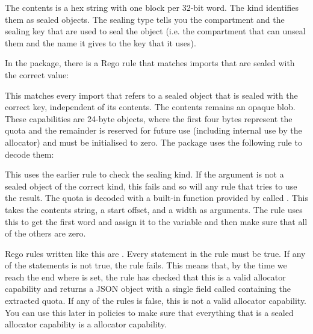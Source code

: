 {\begin{jsonsnippet}
{
  "contents": "00040000 00000000 00000000 00000000 00000000 00000000",
  "kind": "SealedObject",
  "sealing_type": {
    "compartment": "allocator",
    "key": "MallocKey",
    "provided_by": "build/cheriot/cheriot/release/cheriot.allocator.compartment",
    "symbol": "__export.sealing_type.allocator.MallocKey"
  \}
\}
\end{jsonsnippet}

The contents is a hex string with one block per 32-bit word.
The kind identifies them as sealed objects.
The sealing type tells you the compartment and the sealing key that are used to seal the object (i.e. the compartment that can unseal them and the name it gives to the key that it uses).

In the  package, there is a Rego rule that matches imports that are sealed with the correct value:

\regolisting[filename=examples/auditing-rtos/rtos.rego,marker=isallocator,label=lst:isallocatorrego,caption="The Rego rule for matching objects sealed as allocator capabilities"]{}

This matches every import that refers to a sealed object that is sealed with the correct key, independent of its contents.
The contents remains an opaque blob.
These capabilities are 24-byte objects, where the first four bytes represent the quota and the remainder is reserved for future use (including internal use by the allocator) and must be initialised to zero.
The  package uses the following rule to decode them:

\regolisting[filename=examples/auditing-rtos/rtos.rego,marker=decodeallocator,label=lst:decodeallocatorrego,caption="The Rego rule for decoding allocator capabilities"]{}

This uses the earlier rule to check the sealing kind.
If the argument is not a sealed object of the correct kind, this fails and so will any rule that tries to use the result.
The quota is decoded with a built-in function provided by  called .
This takes the contents string, a start offset, and a width as arguments.
The rule uses this to get the first word and assign it to the  variable and then make sure that all of the others are zero.

Rego rules written like this are .
Every statement in the rule must be true.
If any of the statements is not true, the rule fails.
This means that, by the time we reach the end where  is set, the rule has checked that this is a valid allocator capability and returns a JSON object with a single field called  containing the extracted quota.
If any of the rules is false, this is not a valid allocator capability.
You can use this later in policies to make sure that everything that is a sealed allocator capability is a  allocator capability.

}
